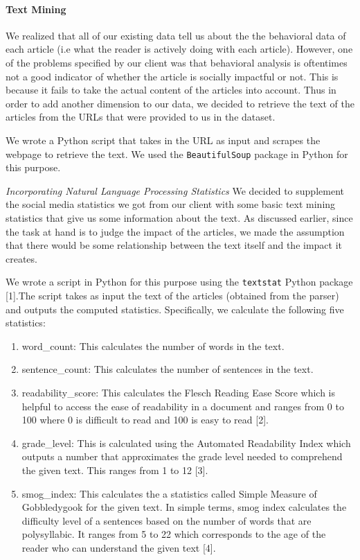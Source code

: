 \documentclass[10pt,letterpaper]{article}
\providecommand{\tightlist}{%
  \setlength{\itemsep}{0pt}\setlength{\parskip}{0pt}}
\begin{document}
\paragraph{Text Mining}\label{text-mining}

We realized that all of our existing data tell us about the the
behavioral data of each article (i.e what the reader is actively doing
with each article). However, one of the problems specified by our client
was that behavioral analysis is oftentimes not a good indicator of
whether the article is socially impactful or not. This is because it
fails to take the actual content of the articles into account. Thus in
order to add another dimension to our data, we decided to retrieve the
text of the articles from the URLs that were provided to us in the
dataset.

We wrote a Python script that takes in the URL as input and scrapes the
webpage to retrieve the text. We used the \texttt{BeautifulSoup} package
in Python for this purpose.

\emph{Incorporating Natural Language Processing Statistics} We decided
to supplement the social media statistics we got from our client with
some basic text mining statistics that give us some information about
the text. As discussed earlier, since the task at hand is to judge the
impact of the articles, we made the assumption that there would be some
relationship between the text itself and the impact it creates.

We wrote a script in Python for this purpose using the \texttt{textstat}
Python package {[}1{]}.The script takes as input the text of the
articles (obtained from the parser) and outputs the computed statistics.
Specifically, we calculate the following five statistics:

\begin{enumerate}
\def\labelenumi{\arabic{enumi}.}
\tightlist
\item
  word\_count: This calculates the number of words in the text.
\item
  sentence\_count: This calculates the number of sentences in the text.
\item
  readability\_score: This calculates the Flesch Reading Ease Score
  which is helpful to access the ease of readability in a document and
  ranges from 0 to 100 where 0 is difficult to read and 100 is easy to
  read {[}2{]}.
\item
  grade\_level: This is calculated using the Automated Readability Index
  which outputs a number that approximates the grade level needed to
  comprehend the given text. This ranges from 1 to 12 {[}3{]}.
\item
  smog\_index: This calculates the a statistics called Simple Measure of
  Gobbledygook for the given text. In simple terms, smog index
  calculates the difficulty level of a sentences based on the number of
  words that are polysyllabic. It ranges from 5 to 22 which corresponds
  to the age of the reader who can understand the given text {[}4{]}.
\end{enumerate}
\end{document}
